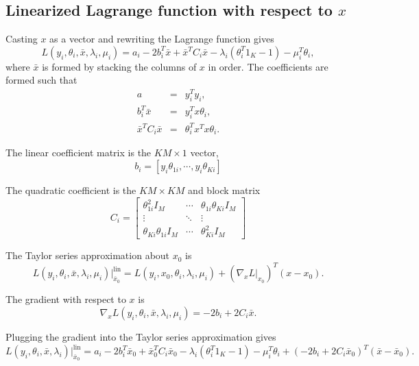 \documentclass[11pt]{article}
\begin{document}
\subsection{Linearized Lagrange function with respect to $x$}

Casting $x$ as a vector and rewriting the Lagrange function gives
\begin{equation}
L(y_i, \theta_i, \bar{x}, \lambda_i, \mu_i) = a_i - 2b_i^T\bar{x} + \bar{x}^TC_i\bar{x} - \lambda_i(\theta_i^T 1_K - 1) -\mu_i^T\theta_i,
\end{equation}
where $\bar{x}$ is formed by stacking the columns of $x$ in order. The coefficients are formed such that
\begin{eqnarray*}
a                     &=&    y_i^T y_i, \\
b_i^T \bar{x}         &=& y_i^T x \theta_i, \\
\bar{x}^T C_i \bar{x} &=& \theta_i^T x^T x \theta_i.
\end{eqnarray*}

The linear coefficient matrix is the $KM \times 1$ vector,
\begin{equation*}
b_i = \left[ y_{i}\theta_{1i}, \cdots, y_{i}\theta_{Ki} \right]
\end{equation*}


The quadratic coefficient is the $KM \times KM$ and block matrix
\begin{equation*}
C_i = 
\left[
\begin{array}{ccc}
\theta^2_{1i} I_M & \cdots & \theta_{1i} \theta_{Ki} I_M \\
\vdots & \ddots & \vdots \\
\theta_{Ki} \theta_{1i} I_M & \cdots & \theta^2_{Ki} I_M 
\end{array} 
\right]
\end{equation*}

The Taylor series approximation about $x_0$ is
\begin{equation}
 L(y_i, \theta_i, \bar{x}, \lambda_i, \mu_i) \bigg|^{\text{lin}}_{\bar{x}_0} = L(y_i, x_0, \theta_i, \lambda_i, \mu_i) + (\nabla_x L \big|_{x_0})^T(x-x_0).
\end{equation}

The gradient with respect to $x$ is
\begin{equation}
\nabla_x L(y_i, \theta_i, \bar{x}, \lambda_i, \mu_i) = -2 b_i + 2 C_i \bar{x}.
\end{equation}

Plugging the gradient into the Taylor series approximation gives
\begin{equation}
L(y_i, \theta_i, \bar{x}, \lambda_i) \bigg|^{\text{lin}}_{\bar{x}_0} = a_i - 2b_i^T\bar{x}_0 + \bar{x}_0^TC_i\bar{x}_0 - \lambda_i(\theta_i^T 1_K - 1) - \mu_i^T \theta_i + (-2 b_i + 2 C_i \bar{x}_0)^T(\bar{x}-\bar{x}_0).
\end{equation}
\end{document}
